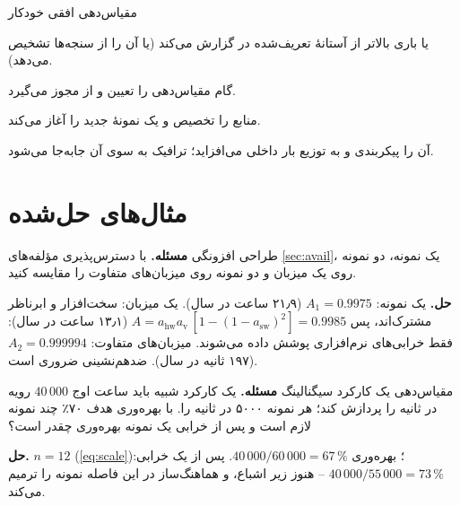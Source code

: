 \documentclass[11pt,a4paper]{article}
\begin{document}
\begin{procedurebox}{مقیاس‌دهی افقی خودکار}\label{proc:scale}
\begin{steps}
  \item {} یا  باری بالاتر از آستانهٔ تعریف‌شده در  گزارش می‌کند (یا  آن را از سنجه‌ها
        تشخیص می‌دهد).
  \item {} گام مقیاس‌دهی را تعیین و از  مجوز می‌گیرد.
  \item {} منابع را تخصیص و یک نمونهٔ جدید  را آغاز می‌کند.
  \item {} آن را پیکربندی و به توزیع بار داخلی  می‌افزاید؛ ترافیک به سوی آن جابه‌جا می‌شود.
\end{steps}
\end{procedurebox}

\begin{acnfigure}
  \caption{مقیاس‌دهی افقی سادهٔ  (\cref{proc:scale}).}
  \label{fig:scale}
\end{acnfigure}

\section{مثال‌های حل‌شده}

\begin{examplebox}{طراحی افزونگی}\label{ex:avail}
\textbf{مسئله.} با دسترس‌پذیری مؤلفه‌های \cref{sec:avail}، یک نمونه، دو نمونه روی یک میزبان و دو نمونه روی میزبان‌های متفاوت
را مقایسه کنید.

\textbf{حل.} یک نمونه: $A_1 = 0.9975$ (۲۱٫۹ ساعت در سال). یک میزبان: سخت‌افزار و ابرناظر مشترک‌اند، پس
$A = a_{\mathrm{hw}}a_{\mathrm{v}}\,[1-(1-a_{\mathrm{sw}})^2] = 0.9985$ (۱۳٫۱ ساعت در سال): فقط خرابی‌های نرم‌افزاری پوشش داده
می‌شوند. میزبان‌های متفاوت: $A_2 = 0.999994$ (۱۹۷ ثانیه در سال). ضدهم‌نشینی ضروری است.
\end{examplebox}

\begin{examplebox}{مقیاس‌دهی یک کارکرد سیگنالینگ}\label{ex:scale}
\textbf{مسئله.} یک کارکرد شبیه  باید ساعت اوج $40\,000$ رویه در ثانیه را پردازش کند؛ هر نمونه ۵۰۰۰ در ثانیه را. با
بهره‌وری هدف ۷۰٪ چند نمونه لازم است و پس از خرابی یک نمونه بهره‌وری چقدر است؟

\textbf{حل.} $n = 12$ (\cref{eq:scale})؛ بهره‌وری $40\,000/60\,000 = 67\,\%$. پس از یک خرابی: $40\,000/55\,000 = 73\,\%$ -- هنوز زیر
اشباع، و هماهنگ‌ساز در این فاصله نمونه را ترمیم می‌کند.
\end{examplebox}
\end{document}
